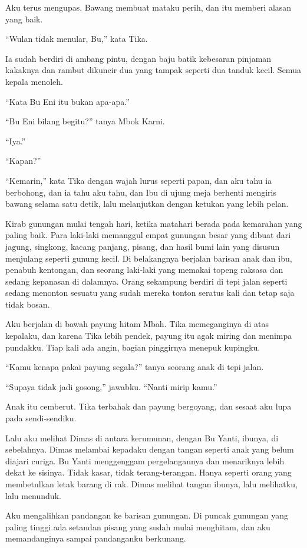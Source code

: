 \documentclass[11pt,twoside,openany]{book}
\makeatletter
\newcommand{\scenebreak}{\par\vspace{0.9em}{\centering\textsc{*\hspace{0.7em}*\hspace{0.7em}*}\par}\vspace{0.9em}\@afterindentfalse\@afterheading}
\makeatother
\begin{document}
Aku terus mengupas. Bawang membuat mataku perih, dan itu memberi alasan yang baik.

``Wulan tidak menular, Bu,'' kata Tika.

Ia sudah berdiri di ambang pintu, dengan baju batik kebesaran pinjaman kakaknya dan rambut dikuncir dua yang tampak seperti dua tanduk kecil. Semua kepala menoleh.

``Kata Bu Eni itu bukan apa-apa.''

``Bu Eni bilang begitu?'' tanya Mbok Karni.

``Iya.''

``Kapan?''

``Kemarin,'' kata Tika dengan wajah lurus seperti papan, dan aku tahu ia berbohong, dan ia tahu aku tahu, dan Ibu di ujung meja berhenti mengiris bawang selama satu detik, lalu melanjutkan dengan ketukan yang lebih pelan.

\scenebreak
Kirab gunungan mulai tengah hari, ketika matahari berada pada kemarahan yang paling baik. Para laki-laki memanggul empat gunungan besar yang dibuat dari jagung, singkong, kacang panjang, pisang, dan hasil bumi lain yang disusun menjulang seperti gunung kecil. Di belakangnya berjalan barisan anak dan ibu, penabuh kentongan, dan seorang laki-laki yang memakai topeng raksasa dan sedang kepanasan di dalamnya. Orang sekampung berdiri di tepi jalan seperti sedang menonton sesuatu yang sudah mereka tonton seratus kali dan tetap saja tidak bosan.

Aku berjalan di bawah payung hitam Mbah. Tika memeganginya di atas kepalaku, dan karena Tika lebih pendek, payung itu agak miring dan menimpa pundakku. Tiap kali ada angin, bagian pinggirnya menepuk kupingku.

``Kamu kenapa pakai payung segala?'' tanya seorang anak di tepi jalan.

``Supaya tidak jadi gosong,'' jawabku. ``Nanti mirip kamu.''

Anak itu cemberut. Tika terbahak dan payung bergoyang, dan sesaat aku lupa pada sendi-sendiku.

Lalu aku melihat Dimas di antara kerumunan, dengan Bu Yanti, ibunya, di sebelahnya. Dimas melambai kepadaku dengan tangan seperti anak yang belum diajari curiga. Bu Yanti menggenggam pergelangannya dan menariknya lebih dekat ke sisinya. Tidak kasar, tidak terang-terangan. Hanya seperti orang yang membetulkan letak barang di rak. Dimas melihat tangan ibunya, lalu melihatku, lalu menunduk.

Aku mengalihkan pandangan ke barisan gunungan. Di puncak gunungan yang paling tinggi ada setandan pisang yang sudah mulai menghitam, dan aku memandanginya sampai pandanganku berkunang.
\end{document}
